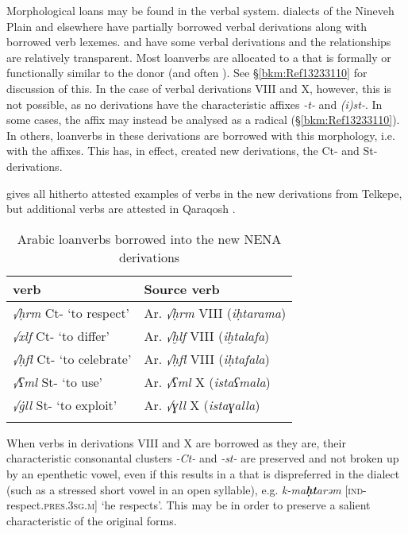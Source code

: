 \documentclass[output=paper]{langsci/langscibook}
\begin{document}
Morphological loans may be found in the verbal system.   dialects of the Nineveh Plain and elsewhere have partially borrowed  verbal derivations along with borrowed verb lexemes.  and  have some  verbal derivations and the relationships are relatively transparent. Most  loanverbs are allocated to a   that is formally or functionally similar to the donor  (and often ). See §\ref{bkm:Ref13233110} for discussion of this. In the case of  verbal derivations VIII and X, however, this is not possible, as no  derivations have the characteristic affixes \textit{{}-t-} and \textit{(i)st-}. In some cases, the affix may instead be analysed as a radical (§\ref{bkm:Ref13233110}). In others, loanverbs in these derivations are borrowed with this  morphology, i.e. with the affixes. This has, in effect, created new derivations, the Ct- and St- derivations.

 gives all hitherto attested examples of verbs in the new derivations from  Telkepe, but additional verbs are attested in  Qaraqosh \citep[130]{Khan2002}.

\begin{table}
\caption{Arabic loanverbs borrowed into the new NENA derivations\label{tab:coghill:1}}
\begin{tabularx}{.75\textwidth}{QQ}
\lsptoprule
{ verb} & {Source verb}\\\midrule
{\textit{√ḥrm} Ct- ‘to respect’} & {Ar. \textit{√ḥrm} VIII (\textit{iḥtarama})}\\
\textit{√xlf} Ct- ‘to differ’ & {Ar. \textit{√ḫlf} VIII (\textit{iḫtalafa})}\\
{\textit{√ḥfl} Ct- ‘to celebrate’} & {Ar. \textit{√ḥfl} VIII (\textit{iḥtafala})}\\
{\textit{√ʕml} St- ‘to use’} & {Ar. \textit{√ʕml} X (\textit{istaʕmala})}\\
\textit{√\.gll} St- ‘to exploit’ & {Ar. \textit{√ɣll} X (\textit{istaɣalla})}\\
\lspbottomrule
\end{tabularx}
\end{table}

When  verbs in derivations VIII and X are borrowed as they are, their characteristic consonantal clusters \textit{{}-Ct-} and \textit{{}-st-} are preserved and not broken up by an epenthetic vowel, even if this results in a  that is dispreferred in the  dialect (such as a stressed short vowel in an open syllable), e.g. \textit{k-ma}\kern -0.5pt\textbf{\textit{ḥt}}\kern -1pt\textit{arəm} [\textsc{ind}\nobreakdash-respect.\textsc{pres.}3\textsc{sg.m}] ‘he respects’. This may be in order to preserve a salient characteristic of the original  forms.
\end{document}
